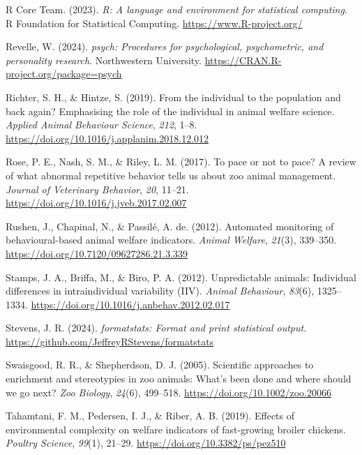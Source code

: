 \documentclass[
  pub]{apa6}
\newlength{\cslhangindent}
\newlength{\cslentryspacingunit} %
\newenvironment{CSLReferences}[2] %
 {%
  \setlength{\parindent}{0pt}
  \ifodd #1
  \let\oldpar\par
  \def\par{\hangindent=\cslhangindent\oldpar}
  \fi
  \setlength{\parskip}{#2\cslentryspacingunit}
 }%
 {}
\begin{document}
\begin{CSLReferences}{1}{0}
\leavevmode{}%
R Core Team. (2023). \emph{R: A language and environment for statistical computing}. R Foundation for Statistical Computing. \url{https://www.R-project.org/}

\leavevmode{}%
Revelle, W. (2024). \emph{{psych}: Procedures for psychological, psychometric, and personality research}. Northwestern University. \url{https://CRAN.R-project.org/package=psych}

\leavevmode{}%
Richter, S. H., \& Hintze, S. (2019). From the individual to the population {\textendash} and back again? {Emphasising} the role of the individual in animal welfare science. \emph{Applied Animal Behaviour Science}, \emph{212}, 1--8. \url{https://doi.org/10.1016/j.applanim.2018.12.012}

\leavevmode{}%
Rose, P. E., Nash, S. M., \& Riley, L. M. (2017). To pace or not to pace? {A} review of what abnormal repetitive behavior tells us about zoo animal management. \emph{Journal of Veterinary Behavior}, \emph{20}, 11--21. \url{https://doi.org/10.1016/j.jveb.2017.02.007}

\leavevmode{}%
Rushen, J., Chapinal, N., \& Passilé, A. de. (2012). Automated monitoring of behavioural-based animal welfare indicators. \emph{Animal Welfare}, \emph{21}(3), 339--350. \url{https://doi.org/10.7120/09627286.21.3.339}

\leavevmode{}%
Stamps, J. A., Briffa, M., \& Biro, P. A. (2012). Unpredictable animals: Individual differences in intraindividual variability ({IIV}). \emph{Animal Behaviour}, \emph{83}(6), 1325--1334. \url{https://doi.org/10.1016/j.anbehav.2012.02.017}

\leavevmode{}%
Stevens, J. R. (2024). \emph{{formatstats}: Format and print statistical output}. \url{https://github.com/JeffreyRStevens/formatstats}

\leavevmode{}%
Swaisgood, R. R., \& Shepherdson, D. J. (2005). Scientific approaches to enrichment and stereotypies in zoo animals: What's been done and where should we go next? \emph{Zoo Biology}, \emph{24}(6), 499--518. \url{https://doi.org/10.1002/zoo.20066}

\leavevmode{}%
Tahamtani, F. M., Pedersen, I. J., \& Riber, A. B. (2019). Effects of environmental complexity on welfare indicators of fast-growing broiler chickens. \emph{Poultry Science}, \emph{99}(1), 21--29. \url{https://doi.org/10.3382/ps/pez510}


\end{CSLReferences}
\end{document}
